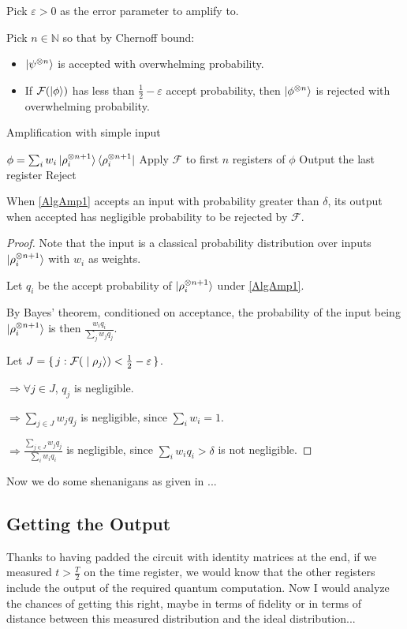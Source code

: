 Pick $\varepsilon>0$ as the error parameter to amplify to.

Pick $n\in\mathbb{N}$ so that by Chernoff bound:
\begin{itemize}
	\item $\ket{\psi^{\otimes n}}$ is accepted with overwhelming probability.
	\item If $\mathcal{F}(\ket{\phi})$ has less than $\frac{1}{2}-\varepsilon$ accept probability, then $\ket{\phi^{\otimes n}}$ is rejected with overwhelming probability.
\end{itemize}

\begin{algorithm}
	\caption{Amplification with simple input}
	\label{AlgAmp1}
	\begin{algorithmic}[1]
		\Require $\phi=\sum_i w_i\ket{\rho_i^{\otimes n+1}}\bra{\rho_i^{\otimes n+1}}$
		\State Apply $\mathcal{F}$ to first $n$ registers of $\phi$
			\State Output the last register
		\Else
			\State Reject
		\EndIf
		\EndProcedure
	\end{algorithmic}
\end{algorithm}

\begin{theorem}
	When \autoref{AlgAmp1} accepts an input with probability greater than $\delta$, its output when accepted has negligible probability to be rejected by $\mathcal{F}$.
\end{theorem}
\begin{proof}
	Note that the input is a classical probability distribution over inputs $\ket{\rho_i^{\otimes n+1}}$ with $w_i$ as weights.

	Let $q_i$ be the accept probability of $\ket{\rho_i^{\otimes n+1}}$ under \autoref{AlgAmp1}. 

	By Bayes' theorem, conditioned on acceptance, the probability of the input being $\ket{\rho_i^{\otimes n+1}}$ is then $\frac{w_i q_i}{\sum_j w_j q_j}$.

	Let $J=\set{j:\mathcal{F}(\ket{\rho_j})<\frac{1}{2}-\varepsilon}$.
	
	$\Rightarrow\forall j\in J$, $q_j$ is negligible.

	$\Rightarrow\sum_{j\in J} w_j q_j$ is negligible, since $\sum_i w_i=1$.
	
	$\Rightarrow\frac{\sum_{j\in J} w_j q_j}{\sum_i w_i q_i}$ is negligible, since $\sum_i w_i q_i>\delta$ is not negligible.
\end{proof}

Now we do some shenanigans as given in \cite{Brandão2017}...

\subsection{Getting the Output}

Thanks to having padded the circuit with identity matrices at the end, if we measured $t>\frac{T}{2}$ on the time register, we would know that the other registers include the output of the required quantum computation. Now I would analyze the chances of getting this right, maybe in terms of fidelity or in terms of distance between this measured distribution and the ideal distribution...

